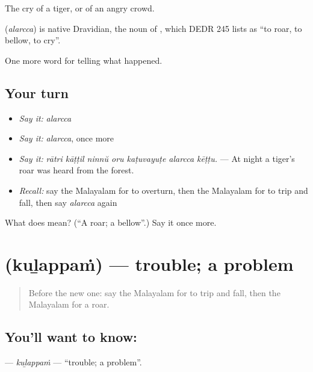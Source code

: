 The cry of a tiger, or of an angry crowd.

\begin{cousinweb}
\textbf{} (\emph{alarcca}) is native Dravidian, the noun of , which DEDR 245 lists as \textquotedblleft{}to roar, to bellow, to cry\textquotedblright{}.
\end{cousinweb}

\begin{grammarlens}[title={What you've built}]
One more word for telling what happened.
\end{grammarlens}

\subsection*{Your turn}
\begin{itemize}
\raggedright
  \item \emph{Say it:} \emph{alarcca}
  \item \emph{Say it:} \emph{alarcca}, once more
  \item \emph{Say it:} \emph{rātri kāṭṭil ninnŭ oru kaṭuvayuṭe alarcca kēṭṭu.} — At night a tiger's roar was heard from the forest.
  \item \emph{Recall:} say the Malayalam for to overturn, then the Malayalam for to trip and fall, then say \emph{alarcca} again
\end{itemize}

\begin{tcolorbox}[breakable,colback=teal!4,colframe=teal!35!black,title={Before you move on}]
What does  mean? (\textquotedblleft{}A roar; a bellow\textquotedblright{}.) Say it once more.
\end{tcolorbox}
\section[\texorpdfstring{\ml{കുഴപ്പം} (kuḻappaṁ)}{കുഴപ്പം (kuḻappaṁ)}]{ (kuḻappaṁ) — trouble; a problem}

\label{lesson:ML-C380-kulappam}



\begin{quote}
Before the new one: say the Malayalam for to trip and fall, then the Malayalam for a roar.
\end{quote}

\subsection*{You'll want to know: }
\textbf{} — \emph{kuḻappaṁ} — \textquotedblleft{}trouble; a problem\textquotedblright{}.

